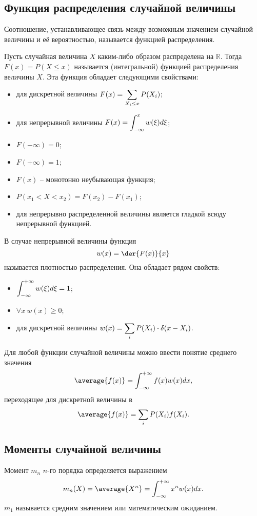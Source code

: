 \subsection{Функция распределения случайной величины}

Соотношение, устанавливающее связь между возможным значением случайной величины
и её вероятностью, называется функцией распределения.

Пусть случайная величина \( X \) каким-либо образом распределена на
\( \mathbb{R} \). Тогда \( F(x) = P(X \le x) \) называется (интегральной)
функцией распределения величины \( X \). Эта функция обладает следующими
свойствами:
\begin{itemize}
    \item для дискретной величины \( \displaystyle F(x) = \sum_{X_i \le x}P(X_i) \);
    \item для непрерывной величины \( \displaystyle F(x) = \int_{-\infty}^x w(\xi)d\xi \);
    \item \( F(-\infty) = 0 \);
    \item \( F(+\infty) = 1 \);
    \item \( F(x) \) -- монотонно неубывающая функция;
    \item \( P(x_1 < X < x_2) = F(x_2) - F(x_1) \);
    \item для непрерывно распределенной величины является гладкой всюду
        непрерывной функцией.
\end{itemize}
В случае непрерывной величины функция
\[
    w(x) = \der{F(x)}{x}
\]
называется плотностью распределения. Она обладает рядом свойств:
\begin{itemize}
    \item \( \displaystyle \int_{-\infty}^{+\infty} w(\xi) d\xi = 1 \);
    \item \( \forall x\ w(x) \ge 0 \);
    \item для дискретной величины
        \( \displaystyle w(x) = \sum_i P(X_i) \cdot \delta(x - X_i) \).
\end{itemize}

Для любой функции случайной величины можно ввести понятие среднего значения
\[
    \average{f(x)} = \int_{-\infty}^{+\infty}f(x)w(x)dx,
\]
переходящее для дискретной величины в
\[
    \average{f(x)} = \sum_i P(X_i)f(X_i).
\]

\subsection{Моменты случайной величины}

Момент \( m_n \) \( n \)-го порядка определяется выражением
\[
    m_n(X) = \average{X^n} = \int_{-\infty}^{+\infty} x^n w(x) dx.
\]
\( m_1 \) называется средним значением или математическим ожиданием.

